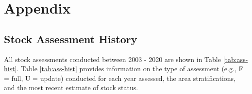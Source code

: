 \documentclass[11pt,
  english,
  a4paper,
]{article}
\begin{document}
\leavevmode\tagmcend\tagstructend

\clearpage


\hypertarget{appendix}{%
\section{Appendix}\label{appendix}}

\leavevmode\tagmcend\tagstructend


\hypertarget{stock-assessment-history}{%
\subsection{Stock Assessment History}\label{stock-assessment-history}}

\leavevmode\tagmcend\tagstructend


All stock assessments conducted between 2003 - 2020 are shown in Table \ref{tab:ass-hist}. Table \ref{tab:ass-hist} provides information on the type of assessment (e.g., F = full, U = update) conducted for each year assessed, the area stratifications, and the most recent estimate of stock status.

\leavevmode\tagmcend\tagstructend\par

\begingroup\fontsize{10}{12}\selectfont
\end{document}
